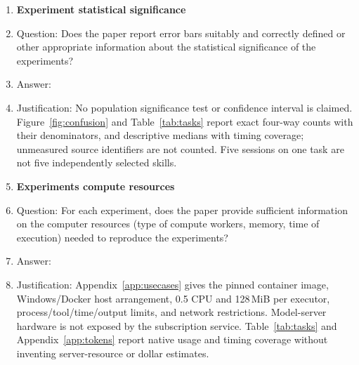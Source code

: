 \begin{enumerate}
\item {\bf Experiment statistical significance}
    \item[] Question: Does the paper report error bars suitably and correctly defined or other appropriate information about the statistical significance of the experiments?
    \item[] Answer: \answerNo{}
    \item[] Justification: No population significance test or confidence interval is claimed. Figure~\ref{fig:confusion} and Table~\ref{tab:tasks} report exact four-way counts with their denominators, and descriptive medians with timing coverage; unmeasured source identifiers are not counted. Five sessions on one task are not five independently selected skills.

\item {\bf Experiments compute resources}
    \item[] Question: For each experiment, does the paper provide sufficient information on the computer resources (type of compute workers, memory, time of execution) needed to reproduce the experiments?
    \item[] Answer: \answerYes{}
    \item[] Justification: Appendix~\ref{app:usecases} gives the pinned container image, Windows/Docker host arrangement, 0.5 CPU and 128\,MiB per executor, process/tool/time/output limits, and network restrictions. Model-server hardware is not exposed by the subscription service. Table~\ref{tab:tasks} and Appendix~\ref{app:tokens} report native usage and timing coverage without inventing server-resource or dollar estimates.


\end{enumerate}
